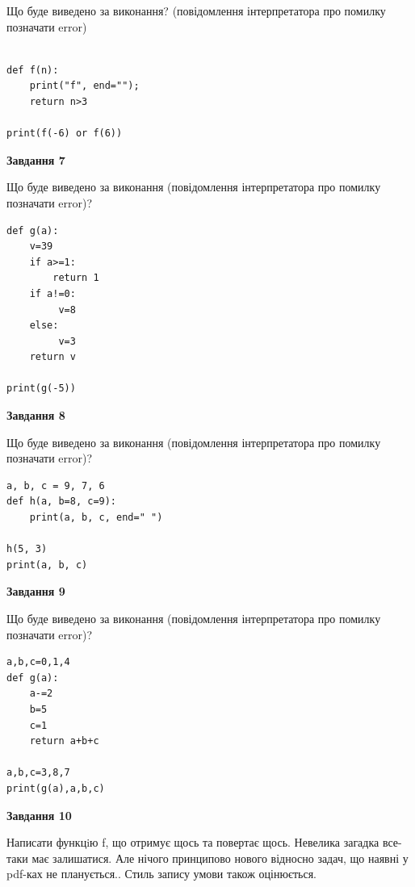 \documentclass[12pt, ukrainian]{article}
\begin{document}
{\begin {large}
Що буде виведено за виконання? (повідомлення інтерпретатора про помилку позначати error)\par
\begin{verbatim}

def f(n):
    print("f", end="");
    return n>3

print(f(-6) or f(6))
\end{verbatim}

{\begin {center}\textbf{Завдання 7}\end {center}}

Що буде виведено за виконання (повідомлення інтерпретатора про помилку позначати error)?\par
\begin{verbatim}
def g(a):
    v=39
    if a>=1: 
        return 1
    if a!=0:
         v=8
    else:
         v=3
    return v

print(g(-5))
\end{verbatim}

{\begin {center}\textbf{Завдання 8}\end {center}}

Що буде виведено за виконання (повідомлення інтерпретатора про помилку позначати error)?\par
\begin{verbatim}
a, b, c = 9, 7, 6
def h(a, b=8, c=9):
    print(a, b, c, end=" ")

h(5, 3)
print(a, b, c)
\end{verbatim}

{\begin {center}\textbf{Завдання 9}\end {center}}

Що буде виведено за виконання (повідомлення інтерпретатора про помилку позначати error)?\par
\begin{verbatim}
a,b,c=0,1,4
def g(a):
    a-=2
    b=5
    c=1
    return a+b+c

a,b,c=3,8,7
print(g(a),a,b,c)
\end{verbatim}

{\begin {center}\textbf{Завдання 10}\end {center}}


Написати функцiю f, що отримує щось та повертає щось. Невелика загадка все-таки має залишатися. Але нічого принципово нового відносно задач, що наявні у pdf-ках не планується.. Стиль запису умови також оцінюється.\par
\end {large}}
\newpage
\end{document}
